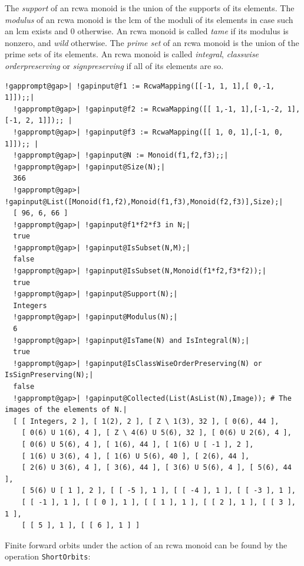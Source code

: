 \documentclass[a4paper,11pt]{report}
\begin{document}
{{        The \emph{support} of an rcwa monoid is the union of the supports of its elements. The \emph{modulus} of an rcwa monoid is the lcm of the moduli of its elements in case such an lcm
exists and 0 otherwise. An rcwa monoid is called \emph{tame} if its modulus is nonzero, and \emph{wild} otherwise. The \emph{prime set} of an rcwa monoid is the union of the prime sets of its elements. An rcwa
monoid is called \emph{integral}, \emph{class\texttt{}wise order\texttt{}preserving} or \emph{sign\texttt{}preserving} if all of its elements are so. 
\begin{Verbatim}[commandchars=!@|,fontsize=\small,frame=single,label=Example]
  !gapprompt@gap>| !gapinput@f1 := RcwaMapping([[-1, 1, 1],[ 0,-1, 1]]);;|
  !gapprompt@gap>| !gapinput@f2 := RcwaMapping([[ 1,-1, 1],[-1,-2, 1],[-1, 2, 1]]);; |
  !gapprompt@gap>| !gapinput@f3 := RcwaMapping([[ 1, 0, 1],[-1, 0, 1]]);; |
  !gapprompt@gap>| !gapinput@N := Monoid(f1,f2,f3);;|
  !gapprompt@gap>| !gapinput@Size(N);|
  366
  !gapprompt@gap>| !gapinput@List([Monoid(f1,f2),Monoid(f1,f3),Monoid(f2,f3)],Size);|
  [ 96, 6, 66 ]
  !gapprompt@gap>| !gapinput@f1*f2*f3 in N;|
  true
  !gapprompt@gap>| !gapinput@IsSubset(N,M);|
  false
  !gapprompt@gap>| !gapinput@IsSubset(N,Monoid(f1*f2,f3*f2));|
  true
  !gapprompt@gap>| !gapinput@Support(N);|
  Integers
  !gapprompt@gap>| !gapinput@Modulus(N);|
  6
  !gapprompt@gap>| !gapinput@IsTame(N) and IsIntegral(N);|
  true
  !gapprompt@gap>| !gapinput@IsClassWiseOrderPreserving(N) or IsSignPreserving(N);|
  false
  !gapprompt@gap>| !gapinput@Collected(List(AsList(N),Image)); # The images of the elements of N.|
  [ [ Integers, 2 ], [ 1(2), 2 ], [ Z \ 1(3), 32 ], [ 0(6), 44 ], 
    [ 0(6) U 1(6), 4 ], [ Z \ 4(6) U 5(6), 32 ], [ 0(6) U 2(6), 4 ], 
    [ 0(6) U 5(6), 4 ], [ 1(6), 44 ], [ 1(6) U [ -1 ], 2 ], 
    [ 1(6) U 3(6), 4 ], [ 1(6) U 5(6), 40 ], [ 2(6), 44 ], 
    [ 2(6) U 3(6), 4 ], [ 3(6), 44 ], [ 3(6) U 5(6), 4 ], [ 5(6), 44 ], 
    [ 5(6) U [ 1 ], 2 ], [ [ -5 ], 1 ], [ [ -4 ], 1 ], [ [ -3 ], 1 ], 
    [ [ -1 ], 1 ], [ [ 0 ], 1 ], [ [ 1 ], 1 ], [ [ 2 ], 1 ], [ [ 3 ], 1 ], 
    [ [ 5 ], 1 ], [ [ 6 ], 1 ] ]
\end{Verbatim}
 Finite forward orbits under the action of an rcwa monoid can be found by the
operation \texttt{ShortOrbits}: 

}}
\end{document}
